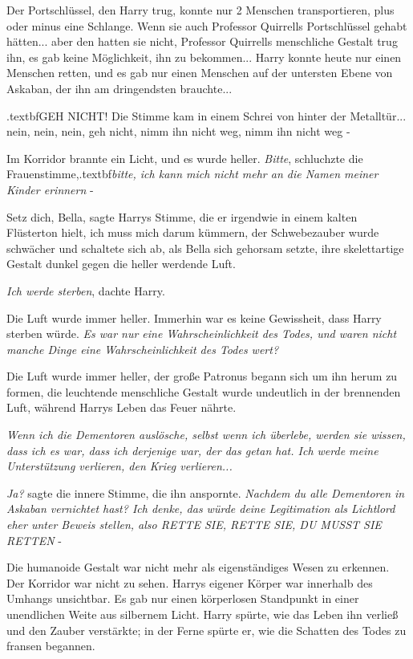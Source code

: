 Der Portschlüssel, den Harry trug, konnte nur 2 Menschen transportieren, plus
oder minus eine Schlange. Wenn sie auch Professor Quirrells Portschlüssel gehabt
hätten... aber den hatten sie nicht, Professor Quirrells menschliche Gestalt
trug ihn, es gab keine Möglichkeit, ihn zu bekommen... Harry konnte heute nur
einen Menschen retten, und es gab nur einen Menschen auf der untersten Ebene von
Askaban, der ihn am dringendsten brauchte...

\grqq{}.textbf{GEH NICHT!}\grqq{} Die Stimme kam in einem Schrei von hinter der
Metalltür... nein, nein, nein, geh nicht, nimm ihn nicht weg, nimm ihn nicht weg
-\grqq{}

Im Korridor brannte ein Licht, und es wurde heller. \glqq{}\emph{Bitte}\grqq{},
schluchzte die Frauenstimme,\grqq{}.textbf{\emph{bitte, ich kann mich nicht mehr
an die Namen meiner Kinder erinnern} }-\grqq{}

\glqq{}Setz dich, Bella\grqq{}, sagte Harrys Stimme, die er irgendwie in einem
kalten Flüsterton hielt, \glqq{}ich muss mich darum kümmern\grqq{}, der
Schwebezauber wurde schwächer und schaltete sich ab, als Bella sich gehorsam
setzte, ihre skelettartige Gestalt dunkel gegen die heller werdende Luft.

\emph{Ich werde sterben}, dachte Harry.

Die Luft wurde immer heller. Immerhin war es keine Gewissheit, dass Harry
sterben würde. \emph{Es war nur eine Wahrscheinlichkeit des Todes, und waren
nicht manche Dinge eine Wahrscheinlichkeit des Todes wert?}

Die Luft wurde immer heller, der große Patronus begann sich um ihn herum zu
formen, die leuchtende menschliche Gestalt wurde undeutlich in der brennenden
Luft, während Harrys Leben das Feuer nährte.

\emph{Wenn ich die Dementoren auslösche, selbst wenn ich überlebe, werden sie
wissen, dass ich es war, dass ich derjenige war, der das getan hat. Ich werde
meine Unterstützung verlieren, den Krieg verlieren...}

\emph{Ja?} sagte die innere Stimme, die ihn anspornte. \emph{Nachdem du alle
Dementoren in Askaban vernichtet hast? Ich denke, das würde deine Legitimation
als Lichtlord eher unter Beweis stellen, also RETTE SIE, RETTE SIE, DU MUSST SIE
RETTEN} -

Die humanoide Gestalt war nicht mehr als eigenständiges Wesen zu erkennen. Der
Korridor war nicht zu sehen. Harrys eigener Körper war innerhalb des Umhangs
unsichtbar. Es gab nur einen körperlosen Standpunkt in einer unendlichen Weite
aus silbernem Licht. Harry spürte, wie das Leben ihn verließ und den Zauber
verstärkte; in der Ferne spürte er, wie die Schatten des Todes zu fransen
begannen.


